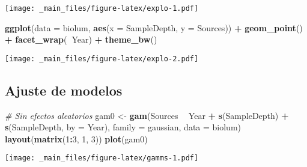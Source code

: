 \documentclass[
]{book}
\newenvironment{Shaded}{\begin{snugshade}}{\end{snugshade}}
\newcommand{\CommentTok}[1]{\textcolor[rgb]{0.56,0.35,0.01}{\textit{#1}}}
\newcommand{\DataTypeTok}[1]{\textcolor[rgb]{0.13,0.29,0.53}{#1}}
\newcommand{\DecValTok}[1]{\textcolor[rgb]{0.00,0.00,0.81}{#1}}
\newcommand{\KeywordTok}[1]{\textcolor[rgb]{0.13,0.29,0.53}{\textbf{#1}}}
\newcommand{\NormalTok}[1]{#1}
\newcommand{\OperatorTok}[1]{\textcolor[rgb]{0.81,0.36,0.00}{\textbf{#1}}}
\newcommand{\StringTok}[1]{\textcolor[rgb]{0.31,0.60,0.02}{#1}}
\begin{document}
\texttt{[image: \_main\_files/figure-latex/explo-1.pdf]}

\begin{Shaded}
\begin{Highlighting}[]
\KeywordTok{ggplot}\NormalTok{(}\DataTypeTok{data =}\NormalTok{ biolum, }\KeywordTok{aes}\NormalTok{(}\DataTypeTok{x =}\NormalTok{ SampleDepth, }\DataTypeTok{y =}\NormalTok{ Sources)) }\OperatorTok{+}
\StringTok{  }\KeywordTok{geom_point}\NormalTok{() }\OperatorTok{+}\StringTok{ }\KeywordTok{facet_wrap}\NormalTok{(}\OperatorTok{~}\NormalTok{Year) }\OperatorTok{+}
\StringTok{  }\KeywordTok{theme_bw}\NormalTok{()}
\end{Highlighting}
\end{Shaded}

\texttt{[image: \_main\_files/figure-latex/explo-2.pdf]}

\hypertarget{ajuste-de-modelos}{%
\subsection{Ajuste de modelos}\label{ajuste-de-modelos}}

\begin{Shaded}
\begin{Highlighting}[]
\CommentTok{# Sin efectos aleatorios}
\NormalTok{gam0 <-}\StringTok{ }\KeywordTok{gam}\NormalTok{(Sources }\OperatorTok{~}\StringTok{ }\NormalTok{Year }\OperatorTok{+}\StringTok{ }\KeywordTok{s}\NormalTok{(SampleDepth) }\OperatorTok{+}\StringTok{ }\KeywordTok{s}\NormalTok{(SampleDepth, }\DataTypeTok{by =}\NormalTok{ Year), }\DataTypeTok{family =}\NormalTok{ gaussian, }\DataTypeTok{data =}\NormalTok{ biolum)}
\KeywordTok{layout}\NormalTok{(}\KeywordTok{matrix}\NormalTok{(}\DecValTok{1}\OperatorTok{:}\DecValTok{3}\NormalTok{, }\DecValTok{1}\NormalTok{, }\DecValTok{3}\NormalTok{))}
\KeywordTok{plot}\NormalTok{(gam0)}
\end{Highlighting}
\end{Shaded}

\texttt{[image: \_main\_files/figure-latex/gamms-1.pdf]}
\end{document}
